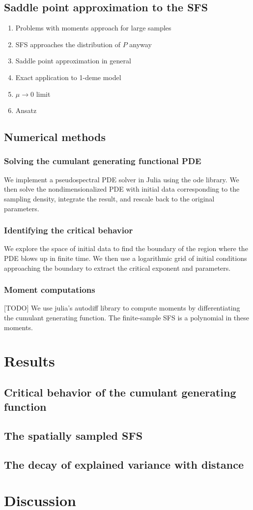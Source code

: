 \documentclass{article}
\begin{document}
\subsection*{Saddle point approximation to the SFS}
\begin{enumerate}
    \item Problems with moments approach for large samples
    \item SFS approaches the distribution of $P$ anyway
    \item Saddle point approximation in general
    \item Exact application to 1-deme model
    \item $\mu \to 0$ limit
    \item Ansatz
\end{enumerate}

\subsection*{Numerical methods}

\subsubsection*{Solving the cumulant generating functional PDE}
We implement a pseudospectral PDE solver in Julia using the ode library.
We then solve the nondimensionalized PDE with initial data corresponding to the sampling density, integrate the result, and rescale back to the original parameters.

\subsubsection*{Identifying the critical behavior}
We explore the space of initial data to find the boundary of the region where the PDE blows up in finite time.
We then use a logarithmic grid of initial conditions approaching the boundary to extract the critical exponent and parameters.

\subsubsection*{Moment computations}
[TODO] We use julia's autodiff library to compute moments by differentiating the cumulant generating function.
The finite-sample SFS is a polynomial in these moments.

\section*{Results}

\subsection*{Critical behavior of the cumulant generating function}

\subsection*{The spatially sampled SFS}

\subsection*{The decay of explained variance with distance}

\section*{Discussion}
\end{document}

